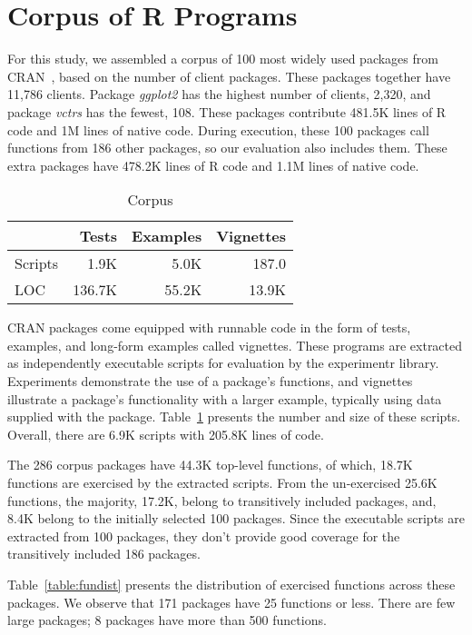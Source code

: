 \documentclass[10pt,review,sigplan,anonymous=true,authorversion=true,nonacm=true]{acmart}
\newcommand{\experimentr}{{\sf experimentr}\xspace}
\newcommand{\ggplot}{\textit{ggplot2}\xspace}
\newcommand{\vctrs}{\textit{vctrs}\xspace}
\begin{document}
\section{Corpus of R Programs}

For this study, we assembled a corpus of 100 most widely used packages from
CRAN~\cite{ligges2017}, based on the number of client packages. These packages
together have 11,786 clients. Package \ggplot has the highest number of clients,
2,320, and package \vctrs has the fewest, 108. These packages contribute 481.5K
lines of R code and 1M lines of native code. During execution, these 100
packages call functions from 186 other packages, so our evaluation also includes
them. These extra packages have 478.2K lines of R code and 1.1M lines of native
code.


\begin{table}[!h]
  \vspace{-3mm}
  \small
  \centering
  \caption{Corpus}\label{table:corpus}
  \vspace{-3mm}
  \begin{tabular}{lrrr}
    \toprule
    &\bf Tests&\bf Examples&\bf Vignettes\\
    \midrule
    {Scripts}&1.9K&5.0K&187.0\\
    \midrule
    {LOC}&136.7K&55.2K&13.9K\\
    \bottomrule
  \end{tabular}
\end{table}

CRAN packages come equipped with runnable code in the form of tests, examples,
and long-form examples called vignettes. These programs are extracted as
independently executable scripts for evaluation by the \experimentr library.
Experiments demonstrate the use of a package's functions, and vignettes
illustrate a package's functionality with a larger example, typically using data
supplied with the package. Table~\ref{table:corpus} presents the number and size
of these scripts. Overall, there are 6.9K scripts with 205.8K lines of code.

The 286 corpus packages have 44.3K top-level functions, of which, 18.7K
functions are exercised by the extracted scripts. From the un-exercised 25.6K
functions, the majority, 17.2K, belong to transitively included packages, and,
8.4K belong to the initially selected 100 packages. Since the executable scripts
are extracted from 100 packages, they don't provide good coverage for the
transitively included 186 packages.

Table~\ref{table:fundist} presents the distribution of exercised functions
across these packages. We observe that 171 packages have 25 functions or less.
There are few large packages; 8 packages have more than 500 functions.
\end{document}
